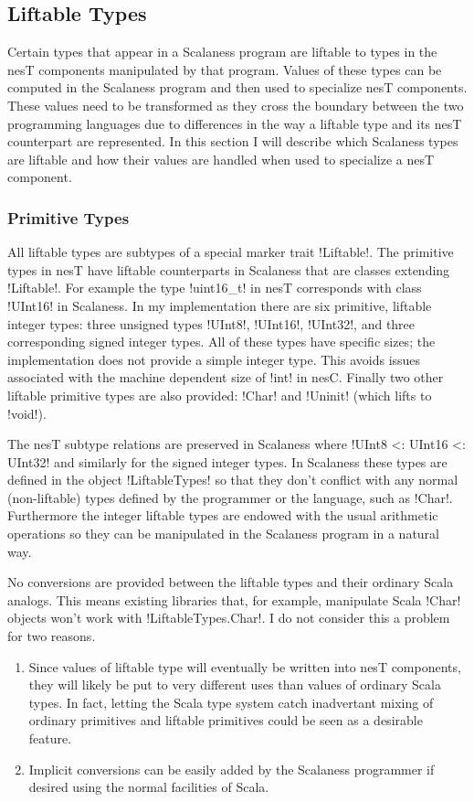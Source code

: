 \subsection{Liftable Types}
\label{section-liftable-types}

Certain types that appear in a Scalaness program are liftable to types in the nesT components
manipulated by that program. Values of these types can be computed in the Scalaness program and
then used to specialize nesT components. These values need to be transformed as they cross the
boundary between the two programming languages due to differences in the way a liftable type and
its nesT counterpart are represented. In this section I will describe which Scalaness types are
liftable and how their values are handled when used to specialize a nesT component.

\subsubsection{Primitive Types}
\label{section-liftable-primitives}

All liftable types are subtypes of a special marker trait !Liftable!. The primitive types in
nesT have liftable counterparts in Scalaness that are classes extending !Liftable!. For example
the type !uint16\_t! in nesT corresponds with class !UInt16! in Scalaness. In my implementation
there are six primitive, liftable integer types: three unsigned types !UInt8!, !UInt16!,
!UInt32!, and three corresponding signed integer types. All of these types have specific sizes;
the implementation does not provide a simple integer type. This avoids issues associated with
the machine dependent size of !int! in nesC. Finally two other liftable primitive types are also
provided: !Char! and !Uninit! (which lifts to !void!).

The nesT subtype relations are preserved in Scalaness where !UInt8 <: UInt16 <: UInt32! and
similarly for the signed integer types. In Scalaness these types are defined in the object
!LiftableTypes! so that they don't conflict with any normal (non-liftable) types defined by the
programmer or the language, such as !Char!. Furthermore the integer liftable types are endowed
with the usual arithmetic operations so they can be manipulated in the Scalaness program in a
natural way.

No conversions are provided between the liftable types and their ordinary Scala analogs. This
means existing libraries that, for example, manipulate Scala !Char! objects won't work with
!LiftableTypes.Char!. I do not consider this a problem for two reasons.
\begin{enumerate}
\item Since values of liftable type will eventually be written into nesT components, they will
  likely be put to very different uses than values of ordinary Scala types. In fact, letting the
  Scala type system catch inadvertant mixing of ordinary primitives and liftable primitives
  could be seen as a desirable feature.
\item Implicit conversions can be easily added by the Scalaness programmer if desired using the
  normal facilities of Scala.
\end{enumerate}


